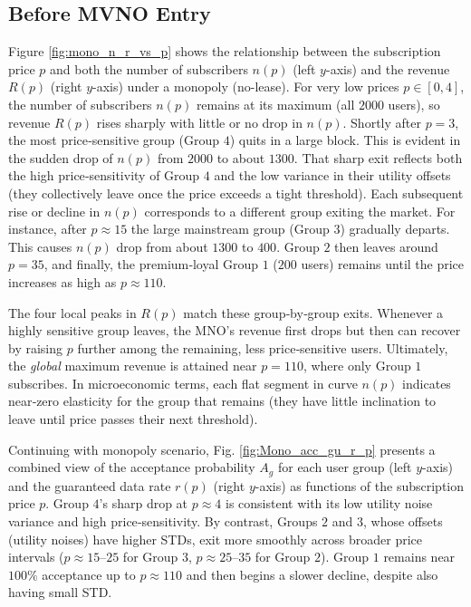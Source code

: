 \documentclass[12pt, draftclsnofoot, onecolumn]{IEEEtran}
\begin{document}
		\subsection{Before MVNO Entry}
		Figure \ref{fig:mono_n_r_vs_p} shows the relationship between the subscription price \( p \) and both the number of subscribers \( n(p) \) (left $y$-axis) and the revenue \( R(p) \) (right $y$-axis) under a monopoly (no-lease). For very low prices \(p\in[0,4]\), the number of subscribers \(n(p)\) remains at its maximum (all $2000$ users), so revenue \(R(p)\) rises sharply with little or no drop in \(n(p)\).  Shortly after \(p=3\), the most price‐sensitive group (Group $4$) quits in a large block. This is evident  in the sudden drop of \(n(p)\) from $2000$ to about $1300$.  That sharp exit reflects both the high price‐sensitivity of Group $4$ and the low variance in their utility offsets (they collectively leave once the price exceeds a tight threshold).  Each subsequent rise or  decline in \(n(p)\) corresponds to a different group exiting the market.  For instance, after \(p\approx 15\) the large mainstream group (Group $3$) gradually departs. This causes \(n(p)\) drop from about $1300$ to $400$.  Group $2$ then leaves around \(p=35\), and finally, the premium‐loyal Group $1$ ($200$ users) remains until the price increases as high as \(p\approx 110\).  
		
		The four local peaks in \(R(p)\) match these group‐by‐group exits.  Whenever a highly sensitive group leaves, the MNO’s revenue first drops but then can recover by raising \(p\) further among the remaining, less price‐sensitive users.  Ultimately, the \emph{global} maximum revenue is attained near \(p=110\), where only Group $1$ subscribes.  In microeconomic terms, each flat segment in curve $n(p)$ indicates near‐zero elasticity for the group that remains (they have little inclination to leave until price passes their next threshold). 
		
		
		Continuing with monopoly scenario, Fig. \ref{fig:Mono_acc_gu_r_p} presents a combined view of the acceptance probability \( A_g \) for each user group (left $y$-axis) and the guaranteed data rate \( r(p) \) (right $y$-axis) as functions of the subscription price \( p \).  Group $4$’s sharp drop at \(p\approx 4\) is consistent with its low utility noise variance and high price‐sensitivity.  By contrast, Groups $2$ and $3$, whose offsets (utility noises) have higher STDs, exit more smoothly across broader price intervals (\(p\approx 15\text{–}25\) for Group $3$, \(p\approx 25\text{–}35\) for Group $2$).  Group $1$ remains near $100\%$ acceptance up to \(p\approx 110\) and then begins a slower decline, despite also having small STD.  
		
\end{document}
